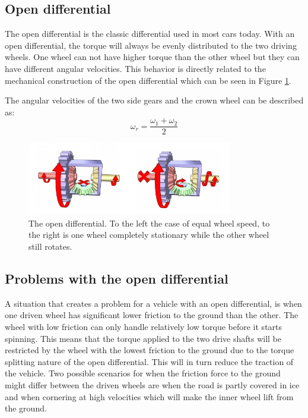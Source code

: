\subsection{Open differential}
The open differential is the classic differential used in most cars today. With an open differential, the torque will always be evenly distributed to the two driving wheels. One wheel can not have higher torque than the other wheel but they can have different angular velocities. This behavior is directly related to the mechanical construction of the open differential which can be seen in Figure \ref{wikidiff}.

The angular velocities of the two side gears and the crown wheel can be described as:
\begin{equation}
\omega_{r} = \frac{\omega_{1} + \omega_{2}}{2}
\label{eq:diff}
\end{equation}

\begin{figure}[h]
	\centering
	\includegraphics[width=0.8\textwidth]{Pictures/opendiff}
	\caption{The open differential. To the left the case of equal wheel speed, to the right is one wheel completely stationary while the other wheel still rotates. \cite{wikidiff}}
	\label{wikidiff}
\end{figure}

\subsection{Problems with the open differential}
A situation that creates a problem for a vehicle with an open differential, is when one driven wheel has significant lower friction to the ground than the other. The wheel with low friction can only handle relatively low torque before it starts spinning. This means that the torque applied to the two drive shafts will be restricted by the wheel with the lowest friction to the ground due to the torque splitting nature of the open differential. This will in turn reduce the traction of the vehicle. Two possible scenarios for when the friction force to the ground might differ between the driven wheels are when the road is partly covered in ice and when cornering at high velocities which will make the inner wheel lift from the ground. 

